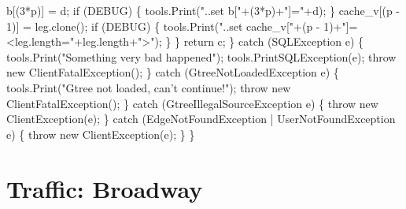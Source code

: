       b[(3*p)] = d;
      if (DEBUG) \{
        tools.Print("..set b["+(3*p)+"]="+d);
      \}
      cache_v[(p - 1)] = leg.clone();
      if (DEBUG) \{
        tools.Print("..set cache_v["+(p - 1)+"]=<leg.length="+leg.length+">");
      \}
    \}
    return c;
  \} catch (SQLException e) \{
    tools.Print("Something very bad happened");
    tools.PrintSQLException(e);
    throw new ClientFatalException();
  \} catch (GtreeNotLoadedException e) \{
    tools.Print("Gtree not loaded, can't continue!");
    throw new ClientFatalException();
  \} catch (GtreeIllegalSourceException e) \{
    throw new ClientException(e);
  \} catch (EdgeNotFoundException | UserNotFoundException e) \{
    throw new ClientException(e);
  \}
\}
\nwendcode{}\nwdocspar

\appendix

\nwenddocs{}\chapter{Traffic: Broadway}

